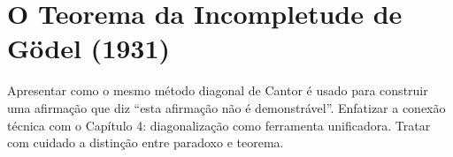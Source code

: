 \section{O Teorema da Incompletude de Gödel (1931)}

Apresentar como o mesmo método diagonal de Cantor é usado para
construir uma afirmação que diz ``esta afirmação não é demonstrável''.
Enfatizar a conexão técnica com o Capítulo 4: diagonalização como
ferramenta unificadora. Tratar com cuidado a distinção entre
paradoxo e teorema.

